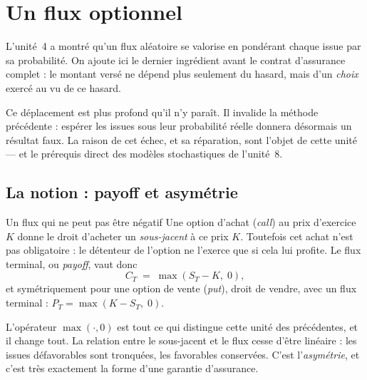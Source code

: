 \section{Un flux optionnel}
\label{sec:U5}

L'unité~4 a montré qu'un flux aléatoire se valorise en pondérant chaque issue par
sa probabilité. On ajoute ici le dernier ingrédient avant le contrat d'assurance
complet : le montant versé ne dépend plus seulement du hasard, mais d'un
\emph{choix} exercé au vu de ce hasard.

Ce déplacement est plus profond qu'il n'y paraît. Il invalide la méthode
précédente : espérer les issues sous leur probabilité réelle donnera désormais
un résultat faux. La raison de cet échec, et sa réparation, sont l'objet de
cette unité --- et le prérequis direct des modèles stochastiques de l'unité~8.

\subsection{La notion : payoff et asymétrie}

\begin{notion}{Un flux qui ne peut pas être négatif}
Une option d’achat (\emph{call}) au prix d'exercice $K$ donne le droit d'acheter un \textit{sous-jacent} à ce prix $K$. Toutefois cet achat n’est pas obligatoire : le détenteur de l’option ne l’exerce que si cela lui profite. Le flux terminal, ou \emph{payoff}, vaut donc
\[
  C_T \;=\; \max(S_T - K,\; 0),
\]
et symétriquement pour une option de vente (\emph{put}), droit de vendre, avec un flux terminal :
$P_T = \max(K - S_T,\; 0)$.

\medskip
L'opérateur $\max(\cdot,0)$ est tout ce qui distingue cette unité des
précédentes, et il change tout. La relation entre le sous-jacent et le flux
cesse d'être linéaire : les issues défavorables sont tronquées, les favorables
conservées. C'est l'\emph{asymétrie}, et c'est très exactement
la forme d'une garantie d'assurance.
\end{notion}

\begin{center}
\end{center}

